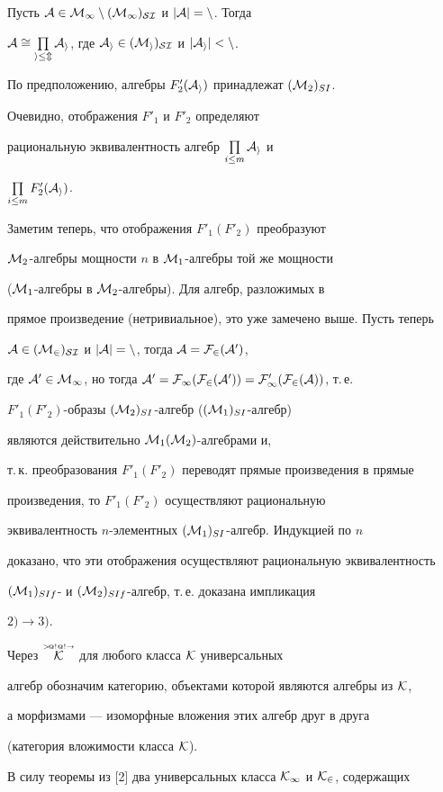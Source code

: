 \begin{pf}
Пусть $\cal A\in{\cal M}_1\setminus ({\cal M}_1)_{SI}$ и $|\cal A|=n$. Тогда


$\cal A\cong\prod\limits_{i\leq m}\cal A_i$, где $\cal A_i\in({\cal M}_i)_{SI}$ и $|\cal A_i|<n$.


По предположению, алгебры $F'_2(\cal A_i)$ принадлежат $({\cal M}_2)_{SI}$.


Очевидно, отображения $F'_1$ и $F'_2$ определяют


рациональную эквивалентность алгебр $\prod\limits_{i\leq m}\cal A_i$ и


$\prod\limits_{i\leq m}F'_2(\cal A_i)$.


Заметим теперь, что отображения $F'_1(F'_2)$ преобразуют


${\cal M}_2$-алгебры мощности $n$ в ${\cal M}_1$-алгебры той же мощности


(${\cal M}_1$-алгебры в ${\cal M}_2$-алгебры). Для алгебр, разложимых в


прямое произведение (нетривиальное), это уже замечено выше. Пусть теперь


$\cal A\in({\cal M}_2)_{SI}$ и $|\cal A|=n$, тогда $\cal A=F_2(\cal A')$,


где $\cal A'\in{\cal M}_1$, но тогда $\cal A'=F_1(F_2(\cal A'))=F'_1(F_2(\cal A))$, т.\,е.


$F'_1(F'_2)$-образы $({\cal M}_2)_{SI}$-алгебр ($({\cal M}_1)_{SI}$-алгебр)


являются действительно ${\cal M}_1({\cal M}_2)$-алгебрами и,


т.\,к. преобразования $F'_1(F'_2)$ переводят прямые произведения в прямые


произведения, то $F'_1(F'_2)$ осуществляют рациональную


эквивалентность $n$-элементных $({\cal M}_1)_{SI}$-алгебр. Индукцией по $n$


доказано, что эти отображения осуществляют рациональную эквивалентность


$({\cal M}_1)_{SIf}$- и $({\cal M}_2)_{SIf}$-алгебр, т.\,е. доказана импликация


$2)\to 3)$.


\end{pf}





Через $\overset{{\scriptscriptstyle >\!@!@!\to}}{\cal K}{}$ для любого класса $\cal K$ универсальных


алгебр обозначим категорию, объектами которой являются алгебры из $\cal K$,


а морфизмами --- изоморфные вложения этих алгебр друг в друга


(категория вложимости класса $\cal K$).


В силу теоремы из [2] два универсальных класса $\cal K_1$ и $\cal K_2$, содержащих


